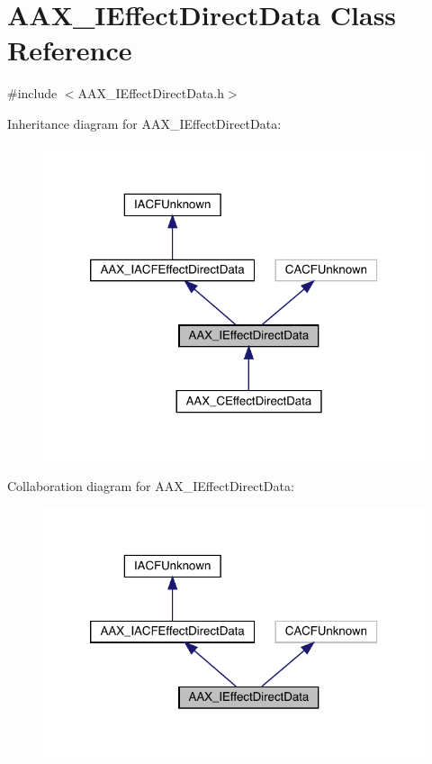 \hypertarget{a01817}{}\section{A\+A\+X\+\_\+\+I\+Effect\+Direct\+Data Class Reference}
\label{a01817}


{\ttfamily \#include $<$A\+A\+X\+\_\+\+I\+Effect\+Direct\+Data.\+h$>$}



Inheritance diagram for A\+A\+X\+\_\+\+I\+Effect\+Direct\+Data\+:
\nopagebreak
\begin{figure}[H]
\begin{center}
\leavevmode
\includegraphics[width=320pt]{a01816}
\end{center}
\end{figure}


Collaboration diagram for A\+A\+X\+\_\+\+I\+Effect\+Direct\+Data\+:
\nopagebreak
\begin{figure}[H]
\begin{center}
\leavevmode
\includegraphics[width=320pt]{a01815}
\end{center}
\end{figure}


